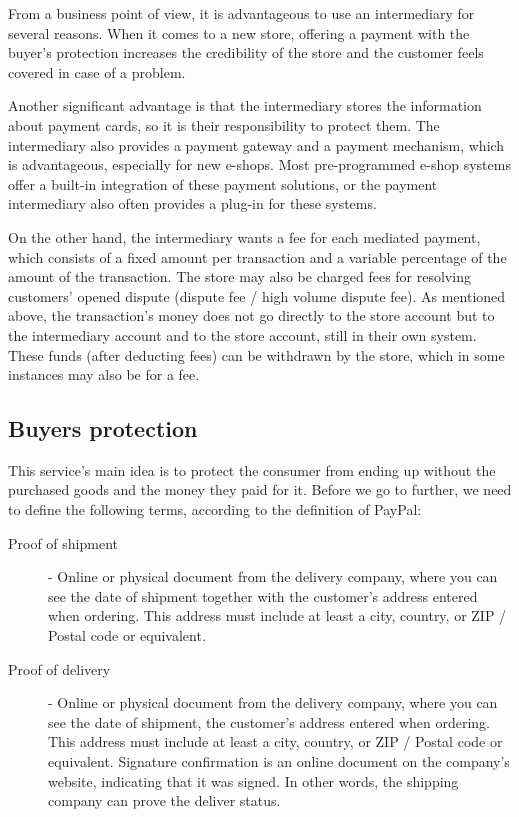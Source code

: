 \documentclass[thesis=M,english]{FITthesis}[2019/12/23]
\begin{document}
From a business point of view, it is advantageous to use an intermediary for several reasons. When it comes to a new store, offering a payment with the buyer's protection increases the credibility of the store and the customer feels covered in case of a problem.

Another significant advantage is that the intermediary stores the information about payment cards, so it is their responsibility to protect them. The intermediary also provides a payment gateway and a payment mechanism, which is advantageous, especially for new e-shops. Most pre-programmed e-shop systems offer a built-in integration of these payment solutions, or the payment intermediary also often provides a plug-in for these systems.

On the other hand, the intermediary wants a fee for each mediated payment, which consists of a fixed amount per transaction and a variable percentage of the amount of the transaction. The store may also be charged fees for resolving customers' opened dispute (dispute fee / high volume dispute fee). As mentioned above, the transaction's money does not go directly to the store account but to the intermediary account and to the store account, still in their own system. These funds (after deducting fees) can be withdrawn by the store, which in some instances may also be for a fee.



\subsection{Buyers protection}

This service's main idea is to protect the consumer from ending up without the purchased goods and the money they paid for it. Before we go to further, we need to define the following terms, according to the definition of PayPal:
\begin{description}
\item[Proof of shipment]
- Online or physical document from the delivery company, where you can see the date of shipment together with the customer's address entered when ordering. This address must include at least a city, country, or ZIP / Postal code or equivalent.

\item[Proof of delivery]
- Online or physical document from the delivery company, where you can see the date of shipment, the customer's address entered when ordering. This address must include at least a city, country, or ZIP / Postal code or equivalent.
Signature confirmation is an online document on the company's website, indicating that it was signed. In other words, the shipping company can prove the deliver status.
\end{description}
\end{document}

